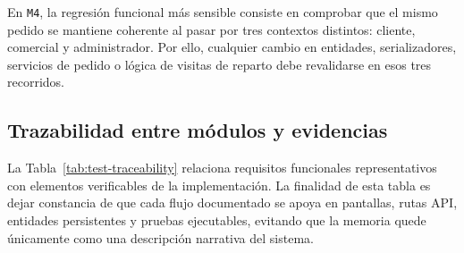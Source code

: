 En \texttt{M4}, la regresión funcional más sensible consiste en comprobar que el mismo pedido se mantiene coherente al pasar por tres contextos distintos: cliente, comercial y administrador. Por ello, cualquier cambio en entidades, serializadores, servicios de pedido o lógica de visitas de reparto debe revalidarse en esos tres recorridos.

\subsection{Trazabilidad entre módulos y evidencias}

La Tabla~\ref{tab:test-traceability} relaciona requisitos funcionales representativos con elementos verificables de la implementación. La finalidad de esta tabla es dejar constancia de que cada flujo documentado se apoya en pantallas, rutas API, entidades persistentes y pruebas ejecutables, evitando que la memoria quede únicamente como una descripción narrativa del sistema.

